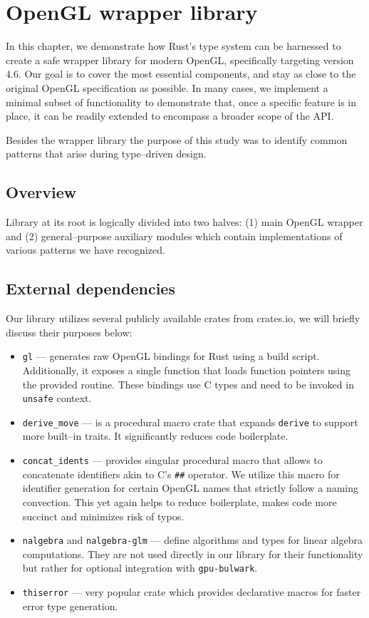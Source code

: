 \chapter{OpenGL wrapper library}

In this chapter, we demonstrate how Rust's type system can be harnessed to create a safe wrapper library for modern OpenGL, specifically targeting version 4.6. Our goal is to cover the most essential components, and stay as close to the original OpenGL specification as possible.
In many cases, we implement a minimal subset of functionality to demonstrate that, once a specific feature is in place, it can be readily extended to encompass a broader scope of the API.

Besides the wrapper library the purpose of this study was to identify common patterns that arise during type--driven design.

\section*{Overview}

Library at its root is logically divided into two halves: (1) main OpenGL wrapper and (2) general--purpose auxiliary modules which contain implementations of various patterns we have recognized.
%
\section{External dependencies}
%
Our library utilizes several publicly available crates from crates.io, we will briefly discuss their purposes below:
\begin{itemize}
    \item \texttt{gl} --- generates raw OpenGL bindings for Rust using a build script. Additionally, it exposes a single function that loads function pointers using the provided routine. 
    These bindings use C types and need to be invoked in \texttt{unsafe} context.
    \item \texttt{derive\_move} --- is a procedural macro crate that expands \texttt{derive} to support more built--in traits. It significantly reduces code boilerplate.
    \item \texttt{concat\_idents} --- provides singular procedural macro that allows to concatenate identifiers akin to C's \texttt{\#\#} operator. We utilize this macro for identifier generation for certain OpenGL names that strictly follow a naming convection. This yet again helps to reduce boilerplate, makes code more succinct and minimizes risk of typos.
    \item \texttt{nalgebra} and \texttt{nalgebra-glm} --- define algorithms and types for linear algebra computations. They are not used directly in our library for their functionality but rather for optional integration with \texttt{gpu-bulwark}.
    \item \texttt{thiserror} --- very popular crate which provides declarative macros for faster error type generation.
\end{itemize}

